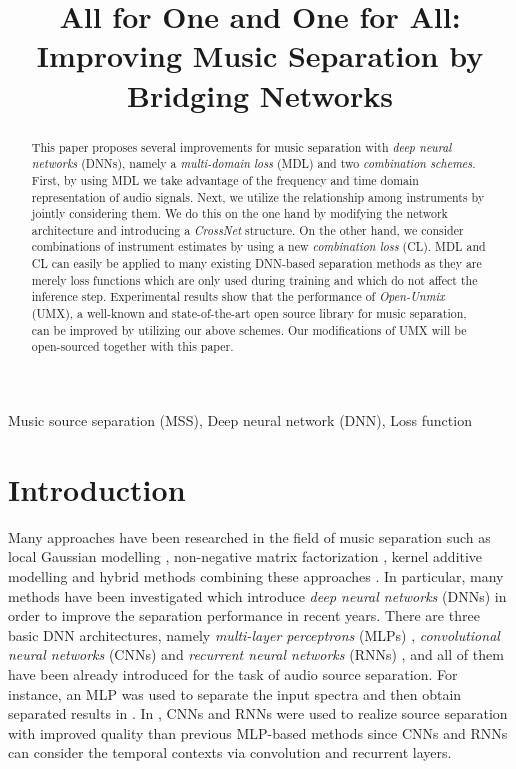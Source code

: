 \documentclass{article}
\title{All for One and One for All:\\Improving Music Separation by Bridging Networks}
\begin{document}
\ninept
\maketitle
\begin{abstract}
This paper proposes several improvements for music separation with \emph{deep neural networks} (DNNs), namely a \emph{multi-domain loss} (MDL) and two \emph{combination schemes}.
First, by using MDL we take advantage of the frequency and time domain representation of audio signals.
Next, we utilize the relationship among instruments by jointly considering them. We do this on the one hand by modifying the network architecture and introducing a \emph{CrossNet} structure. On the other hand, we consider combinations of instrument estimates by using a new \emph{combination loss} (CL).
MDL and CL can easily be applied to many existing DNN-based separation methods as they are merely loss functions which are only used during training and which do not affect the inference step.
Experimental results show that the performance of \emph{Open-Unmix} (UMX), a well-known and state-of-the-art open source library for music separation, can be improved by utilizing our above schemes.
Our modifications of UMX will be open-sourced together with this paper.
\end{abstract}
\begin{keywords}
Music source separation (MSS), Deep neural network (DNN), Loss function
\end{keywords}
\section{Introduction}
\label{sec:intro}
Many approaches have been researched in the field of music separation such as local Gaussian modelling \cite{mss_gmodel_1, mss_gmodel_2}, non-negative matrix factorization \cite{mss_nmf_1, mss_nmf_2, mss_nmf_3}, kernel additive modelling \cite{mss_kernel_additive_1} and hybrid methods combining these approaches \cite{mss_combi_1, mss_combi_2}.
In particular, many methods have been investigated which introduce \emph{deep neural networks} (DNNs) in order to improve the separation performance in recent years.
There are three basic DNN architectures, namely \emph{multi-layer perceptrons} (MLPs) \cite{mlp_org}, \emph{convolutional neural networks} (CNNs) \cite{cnn_org} and \emph{recurrent neural networks} (RNNs) \cite{rnn_org}, and all of them have been already introduced for the task of audio source separation.
For instance, an MLP was used to separate the input spectra and then obtain separated results in \cite{mss_mlp_1, mss_mlp_2}.
In \cite{mss_cnn_1, mss_rnn_1}, CNNs and RNNs were used to realize source separation with improved quality than previous MLP-based methods since CNNs and RNNs can consider the temporal contexts via convolution and recurrent layers. 
\end{document}
